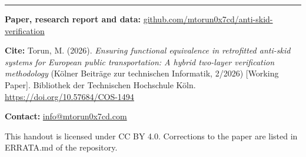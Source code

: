 \documentclass[a4paper,10pt]{article}
\begin{document}
\vfill
{\color{ieeeblue}\rule{\linewidth}{0.6pt}}
\vspace{0.3ex}
{\footnotesize\color{inkgray}
\textbf{Paper, research report and data:} \href{https://github.com/mtorun0x7cd/anti-skid-verification}{github.com/mtorun0x7cd/anti-skid-verification}

\textbf{Cite:} Torun, M. (2026). \emph{Ensuring functional equivalence in retrofitted anti-skid systems for European public transportation: A hybrid two-layer verification methodology} (K\"olner Beitr\"age zur technischen Informatik, 2/2026) [Working Paper]. Bibliothek der Technischen Hochschule K\"oln. \href{https://doi.org/10.57684/COS-1494}{https://doi.org/10.57684/COS-1494}

\textbf{Contact:} \href{mailto:info@mtorun0x7cd.com}{info@mtorun0x7cd.com}

This handout is licensed under CC BY 4.0. Corrections to the paper are listed in ERRATA.md of the repository.
\par}
\end{document}
